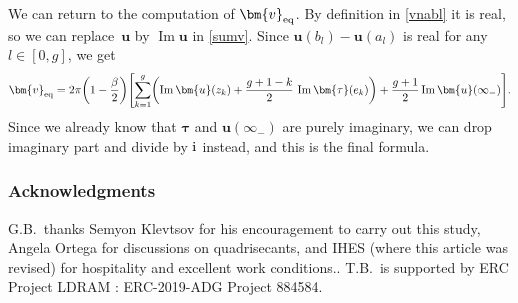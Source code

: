 \documentclass[pdftex]{sigma}
\numberwithin{equation}{section}
\begin{document}
We can return to the computation of $\bm{v}_{{\rm eq}}$. By definition in \eqref{vnabl} it is real, so we can replace~$\bm{u}$ by $\operatorname{Im} \bm{u}$ in \eqref{sumv}. Since $\bm{u}(b_l) - \bm{u}(a_l)$ is real for any $l \in [0,g]$, we get
\[
\bm{v}_{{\rm eq}} = 2\pi\biggl(1 - \frac{\beta}{2}\biggr)\Biggl[ \sum_{k = 1}^{g} \biggl(\operatorname{Im}\bm{u}(z_k) + \frac{g + 1 - k}{2}\,\operatorname{Im}\bm{\tau}(e_k)\biggr)+ \frac{g + 1}{2} \operatorname{Im}\bm{u}(\infty_-)\Biggr].
\]
Since we already know that $\bm{\tau}$ and $\bm{u}(\infty_-)$ are purely imaginary, we can drop imaginary part and divide by ${\rm i}$ instead, and this is the final formula.

\subsubsection*{Acknowledgments}


G.B.\ thanks Semyon Klevtsov for his encouragement to carry out this study, Angela Ortega for discussions on quadrisecants, and IHES (where this article was revised) for hospitality and excellent work conditions..
T.B.\ is supported by ERC Project LDRAM : ERC-2019-ADG Project 884584.
\end{document}
